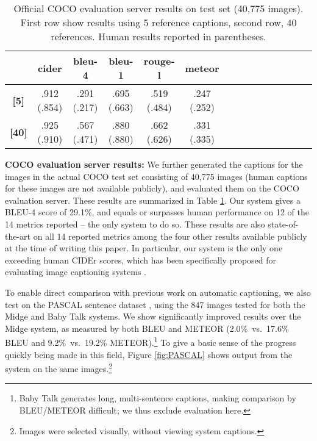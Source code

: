 \documentclass[10pt,twocolumn,letterpaper]{article}
\begin{document}
\begin{table}
\caption{Official COCO evaluation server results on test set (40,775 images). First row show results using 5 reference captions, second row, 40 references. Human results reported in parentheses.\vspace{1mm}}
\centering
\resizebox{\columnwidth}{!} {
\begin{tabular}{@{}ccccccccccccccc@{}}
 \toprule
 & {\sc cide}r & {\sc bleu-{\small 4}} & {\sc bleu-{\small 1}} & {\sc rouge-l} & {\sc meteor} \\
 \midrule
 {\bf [5]} & .912 (.854) & .291 (.217) & .695 (.663) &  .519 (.484) & .247 (.252)\\
 {\bf [40]} & .925 (.910) & .567 (.471) & .880 (.880) & .662 (.626) & .331 (.335) \\
 \bottomrule
\end{tabular}}
\label{tab:official_coco}
\vspace{-1em}
\end{table}

\textbf{COCO evaluation server results:} We further generated the captions for the images in the actual COCO test set consisting of 40,775 images (human captions for these images are not available publicly), and evaluated them on the COCO evaluation server. These results are summarized in Table \ref{tab:official_coco}. Our system gives a BLEU-4 score of 29.1\%, and equals or surpasses human performance on 12 of the 14 metrics reported -- the only system to do so. These results are also state-of-the-art on all 14 reported metrics among the four other results available publicly at the time of writing this paper. In particular, our system is the only one exceeding human CIDEr scores, which has been specifically proposed for evaluating image captioning systems \cite{VedantamCORR14}.

To enable direct comparison with previous work on automatic captioning, we also test on the PASCAL sentence dataset \cite{Rashtchian2010}, using the 847 images tested for both the Midge \cite{mitchell2012midge} and Baby Talk \cite{kulkarni2011baby} systems. We show significantly improved results over the Midge \cite{mitchell2012midge} system, as measured by both BLEU and METEOR (2.0\%~vs.~17.6\% BLEU and 9.2\%~vs.~19.2\% METEOR).\footnote{Baby Talk generates long, multi-sentence captions, making comparison by BLEU/METEOR difficult; we thus exclude evaluation here.} To give a basic sense of the progress quickly being made in this field, Figure \ref{fig:PASCAL} shows output from the system on the same images.\footnote{Images were selected visually, without viewing system captions.}
\end{document}
